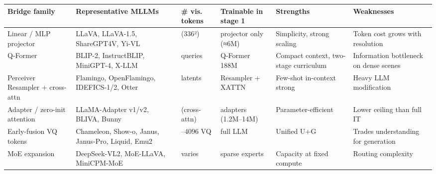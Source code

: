 {\def\LTcaptype{none} %
\begin{longtable}[]{@{}
  >{\raggedright\arraybackslash}p{}
  >{\raggedright\arraybackslash}p{}
  >{\raggedright\arraybackslash}p{}
  >{\raggedright\arraybackslash}p{}
  >{\raggedright\arraybackslash}p{}
  >{\raggedright\arraybackslash}p{}@{}}
\toprule\noalign{}
\begin{minipage}[b]{\linewidth}\raggedright
\textbf{Bridge family}
\end{minipage} & \begin{minipage}[b]{\linewidth}\raggedright
\textbf{Representative MLLMs}
\end{minipage} & \begin{minipage}[b]{\linewidth}\raggedright
\textbf{\# vis. tokens}
\end{minipage} & \begin{minipage}[b]{\linewidth}\raggedright
\textbf{Trainable in stage 1}
\end{minipage} & \begin{minipage}[b]{\linewidth}\raggedright
\textbf{Strengths}
\end{minipage} & \begin{minipage}[b]{\linewidth}\raggedright
\textbf{Weaknesses}
\end{minipage} \\
\midrule\noalign{}
\endhead
\bottomrule\noalign{}
\endlastfoot
Linear / MLP projector & LLaVA, LLaVA-1.5, ShareGPT4V, Yi-VL & 576 (336²) & projector only (≈6M) & Simplicity, strong scaling & Token cost grows with resolution \\
Q-Former & BLIP-2, InstructBLIP, MiniGPT-4, X-LLM & 32 queries & Q-Former 188M & Compact context, two-stage curriculum & Information bottleneck on dense scenes \\
Perceiver Resampler + cross-attn & Flamingo, OpenFlamingo, IDEFICS-1/2, Otter & 64 latents & Resampler + XATTN & Few-shot in-context strong & Heavy LLM modification \\
Adapter / zero-init attention & LLaMA-Adapter v1/v2, BLIVA, Bunny & 0 (cross-attn) & adapters (1.2M--14M) & Parameter-efficient & Lower ceiling than full IT \\
Early-fusion VQ tokens & Chameleon, Show-o, Janus, Janus-Pro, Liquid, Emu2 & 1024--4096 VQ & full LLM & Unified U+G & Trades understanding for generation \\
MoE expansion & DeepSeek-VL2, MoE-LLaVA, MiniCPM-MoE & varies & sparse experts & Capacity at fixed compute & Routing complexity \\
\end{longtable}
}

